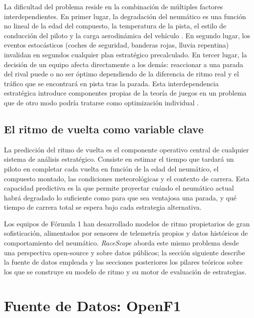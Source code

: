 La dificultad del problema reside en la combinación de múltiples factores interdependientes. En primer lugar, la degradación del neumático es una función no lineal de la edad del compuesto, la temperatura de la pista, el estilo de conducción del piloto y la carga aerodinámica del vehículo \cite{pacejka2006tyre,farroni2019trt}. En segundo lugar, los eventos estocásticos (coches de seguridad, banderas rojas, lluvia repentina) invalidan en segundos cualquier plan estratégico precalculado. En tercer lugar, la decisión de un equipo afecta directamente a los demás: reaccionar a una parada del rival puede o no ser óptimo dependiendo de la diferencia de ritmo real y el tráfico que se encontrará en pista tras la parada. Esta interdependencia estratégica introduce componentes propias de la teoría de juegos en un problema que de otro modo podría tratarse como optimización individual \cite{aguad2024dp}.

\subsection{El ritmo de vuelta como variable clave}
\label{subsec:ritmo_vuelta}

La predicción del ritmo de vuelta es el componente operativo central de cualquier sistema de análisis estratégico. Consiste en estimar el tiempo que tardará un piloto en completar cada vuelta en función de la edad del neumático, el compuesto montado, las condiciones meteorológicas y el contexto de carrera. Esta capacidad predictiva es la que permite proyectar cuándo el neumático actual habrá degradado lo suficiente como para que sea ventajosa una parada, y qué tiempo de carrera total se espera bajo cada estrategia alternativa.

Los equipos de Fórmula 1 han desarrollado modelos de ritmo propietarios de gran sofisticación, alimentados por sensores de telemetría propios y datos históricos de comportamiento del neumático. \textit{RaceScope} aborda este mismo problema desde una perspectiva open-source y sobre datos públicos; la sección siguiente describe la fuente de datos empleada y las secciones posteriores los pilares teóricos sobre los que se construye su modelo de ritmo y su motor de evaluación de estrategias.

\section{Fuente de Datos: OpenF1}
\label{sec:openf1}


